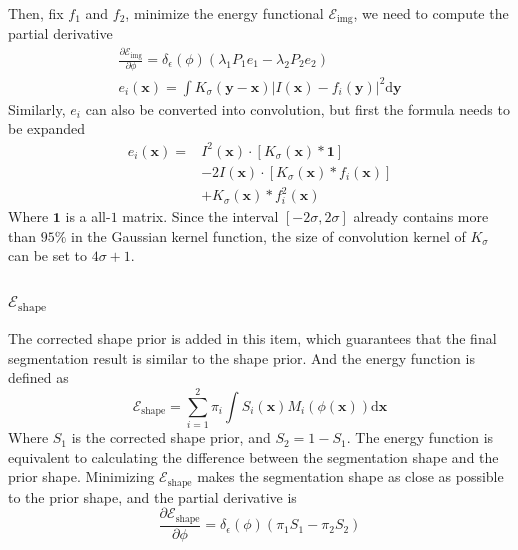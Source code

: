 Then, fix $f_1$ and $f_2$, minimize the energy functional $\mathcal{E}_{\text{img}}$, we need to compute the partial derivative
\begin{multline}\label{eq: Level Set 1-item}
    \frac{\partial \mathcal{E}_{\text{img}}}{\partial \phi} = \delta_\epsilon(\phi)\left(\lambda_1P_1e_1-  \lambda_2P_2e_2 \right) \\
    e_i(\mathbf{x}) = \int K_\sigma(\mathbf{y}-\mathbf{x})\left| I(\mathbf{x})-f_i(\mathbf{y}) \right|^2 \mathrm{d}\mathbf{y}
\end{multline}
Similarly, $e_i$ can also be converted into convolution, but first the formula needs to be expanded
\begin{equation*}
    \begin{split}
        e_i(\mathbf{x}) =
        & I^2(\mathbf{x})\cdot\left[ K_\sigma(\mathbf{x})\ast \mathbf{1} \right] \\
        & - 2I(\mathbf{x})\cdot\left[ K_\sigma(\mathbf{x})\ast f_i(\mathbf{x}) \right] \\
        & + K_\sigma(\mathbf{x}) \ast f_i^2(\mathbf{x})
    \end{split}
\end{equation*}
Where $\mathbf{1}$ is a all-$1$ matrix. Since the interval $[-2\sigma, 2\sigma]$ already contains more than $95\%$ in the Gaussian kernel function, the size of convolution kernel of $K_\sigma$ can be set to $4\sigma +1$.

\subsubsection{$\mathcal{E}_{\text{shape}}$}
The corrected shape prior is added in this item, which guarantees that the final segmentation result is similar to the shape prior. And the energy function is defined as
\begin{equation}
    \mathcal{E}_{\text{shape}} = \sum_{i=1}^2 \pi_i \int S_i(\mathbf{x}) M_i(\phi(\mathbf{x})) \mathrm{d}\mathbf{x}
\end{equation}
Where $S_1$ is the corrected shape prior, and $S_2 = 1- S_1$. The energy function is equivalent to calculating the difference between the segmentation shape and the prior shape. Minimizing $\mathcal{E}_{\text{shape}}$ makes the segmentation shape as close as possible to the prior shape, and the partial derivative is
\begin{equation}\label{eq: Level Set 2-item}
    \frac{\partial \mathcal{E}_{\text{shape}}}{\partial \phi} = \delta_\epsilon(\phi)(\pi_1 S_1 - \pi_2 S_2)
\end{equation}


